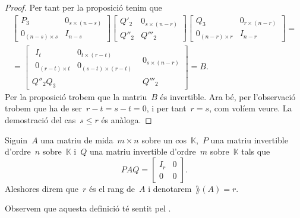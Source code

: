 \documentclass[../../Main.tex]{subfiles}
\begin{document}
\begin{theorem}
\begin{proof}
			Per tant per la proposició  tenim que
			\begin{multline*}
			\left[\begin{array}{c|c}
			P_{3} & 0_{s\times(n-s)} \\\hline
			0_{(n-s)\times s} & I_{n-s}
			\end{array}\right]
			\left[\begin{array}{c|c}
			Q'_{2} & 0_{s\times(n-r)} \\\hline
			Q''_{2} & Q'''_{2}
			\end{array}\right]
			\left[\begin{array}{c|c}
			Q_{3} & 0_{r\times(n-r)} \\\hline
			0_{(n-r)\times r} & I_{n-r}
			\end{array}\right]=\\=
			\left[\begin{array}{c|c}
				\begin{array}{c|c}
				I_{t} & 0_{t\times(r-t)} \\\hline
				0_{(r-t)\times t} & 0_{(s-t)\times(r-t)}
				\end{array}
			& 0_{s\times(n-r)} \\\hline
			Q''_{2}Q_{3} & Q'''_{2}
			\end{array}\right]=B.
			\end{multline*}
			Per la proposició  trobem que la matriu~\(B\) és invertible.
			Ara bé, per l'observació  trobem que ha de ser~\(r-t=s-t=0\), i per tant~\(r=s\), com volíem veure.
			La demostració del cas~\(s\leq r\) és anàloga.
		\end{proof}
	\end{theorem}
	\begin{definition}[Rang]
		\label{def:rang d'una matriu}
		Siguin~\(A\) una matriu de mida~\(m\times n\) sobre un cos~\(\mathbb{K}\),~\(P\) una matriu invertible d'ordre~\(n\) sobre~\(\mathbb{K}\) i~\(Q\) una matriu invertible d'ordre~\(m\) sobre~\(\mathbb{K}\) tals que
		\[PAQ=\left[\begin{array}{c|c}
		I_{r} & 0 \\\hline
		0 & 0
		\end{array}\right].\]
		Aleshores direm que~\(r\) és el rang de~\(A\) i denotarem~\(\rang(A)=r\).

		Observem que aquesta definició té sentit pel .
	\end{definition}
\end{document}
